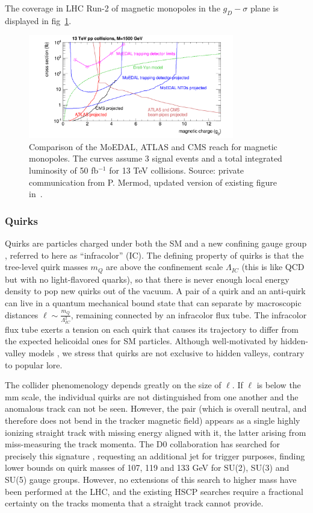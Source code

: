 The coverage in LHC Run-2 of magnetic monopoles in the $g_D-\sigma$ plane is displayed in fig~\ref{fig:magnetic_monopole_reach}.
\begin{figure}[htb]
\centering
\includegraphics[width=0.8\textwidth]{plots/monopoles_xsec_13TeV_3events}
\caption{Comparison of the MoEDAL, ATLAS and CMS reach for magnetic monopoles. The curves assume 3 signal events and a total integrated luminosity of 50 fb$^{-1}$ for 13 TeV collisions. Source: private communication from P. Mermod, updated version of existing figure in~\cite{DeRoeck:2011aa}.}
\label{fig:magnetic_monopole_reach}
\end{figure}

\subsubsection{Quirks}

Quirks are particles charged under both the SM and a new confining gauge group \cite{Kang:2008ea}, referred to here as ``infracolor'' (IC). The defining property of quirks is that the tree-level quirk masses $m_Q$ are above the confinement scale $\Lambda_{IC}$ (this is like QCD but with no light-flavored quarks), so that there is never enough local energy density to pop new quirks out of the vacuum.  A pair of a quirk and an anti-quirk can live in a quantum mechanical bound state that can separate by macroscopic distances $\ell \sim \frac{m_Q}{\Lambda_{IC}^2}$, remaining connected by an infracolor flux tube. The infracolor flux tube exerts a tension on each quirk that causes its trajectory to differ from the expected helicoidal ones for SM particles. Although well-motivated by hidden-valley models \cite{Strassler:2006im}, we stress that quirks are not exclusive to hidden valleys, contrary to popular lore.

The collider phenomenology depends greatly on the size of $\ell$.  If $\ell$ is below the mm scale, the individual quirks are not distinguished from one another and the anomalous track can not be seen. However, the pair (which is overall neutral, and therefore does not bend in the tracker magnetic field) appears as a single highly ionizing straight track with missing energy aligned with it, the latter arising from miss-measuring the track momenta.
The D0 collaboration has searched for precisely this signature \cite{Abazov:2010yb}, requesting an additional jet for trigger purposes, finding lower bounds on quirk masses of 107, 119 and 133 GeV for SU(2), SU(3) and SU(5) gauge groups. However, no extensions of this search to higher mass have been performed at the LHC, and the existing HSCP searches require a fractional certainty on the tracks momenta that a straight track cannot provide.

